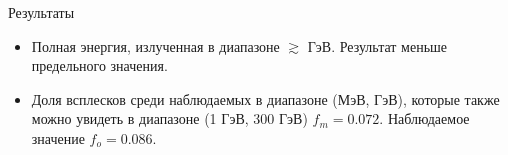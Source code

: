 \documentclass[russian]{beamer}
\begin{document}
\begin{frame}
\begin{columns}[t]
\begin{column}[t]{0.4\linewidth}
\begin{block}{Результаты}
			   		\begin{itemize}
			   			\item{Полная энергия, излученная в диапазоне $\gtrsim$ \unit[1]{ГэВ}. Результат меньше предельного значения.}
			   			\item{Доля всплесков среди наблюдаемых в диапазоне (\unit[100]{МэВ}, \unit[1]{ГэВ}), которые также можно увидеть в диапазоне (1 ГэВ, 300 ГэВ) $f_m = 0.072$. Наблюдаемое значение $f_o = 0.086$.}
			   		\end{itemize}

			   	\end{block}

			\end{column}

		\end{columns}
	\end{frame}
\end{document}
